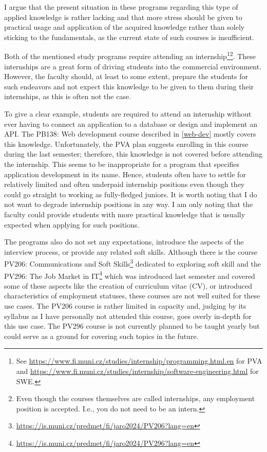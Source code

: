 \documentclass[
  digital,
  color,
  oneside,
  nosansbold,
  nocolorbold,
  nolof,
  nolot,
]{fithesis4}
\begin{document}
I argue that the present situation in these programs regarding this type of applied knowledge is rather lacking and that more stress should be given to practical usage and application of the acquired knowledge rather than solely sticking to the fundamentals, as the current state of such courses is insufficient.

Both of the mentioned study programs require attending an internship\footnote{See \url{https://www.fi.muni.cz/studies/internship/programming.html.en} for PVA and \url{https://www.fi.muni.cz/studies/internship/software-engineering.html} for SWE.}\footnote{Even though the courses themselves are called internships, any employment position is accepted. I.e., you do not need to be an intern.}. These internships are a great form of driving students into the commercial environment. However, the faculty should, at least to some extent, prepare the students for such endeavors and not expect this knowledge to be given to them during their internships, as this is often not the case. 

To give a clear example, students are required to attend an internship without ever having to connect an application to a database or design and implement an API. The PB138: Web development course described in \cref{web-dev} mostly covers this knowledge. Unfortunately, the PVA plan suggests enrolling in this course during the last semester; therefore, this knowledge is not covered before attending the internship. This seems to be inappropriate for a program that specifies application development in its name. Hence, students often have to settle for relatively limited and often underpaid internship positions even though they could go straight to working as fully-fledged juniors. It is worth noting that I do not want to degrade internship positions in any way. I am only noting that the faculty could provide students with more practical knowledge that is usually expected when applying for such positions.

The programs also do not set any expectations, introduce the aspects of the interview process, or provide any related soft skills. Although there is the course PV206: Communications and Soft Skills\footnote{\url{https://is.muni.cz/predmet/fi/jaro2024/PV206?lang=en}} dedicated to exploring soft skill and the PV296: The Job Market in IT\footnote{\url{https://is.muni.cz/predmet/fi/jaro2024/PV296?lang=en}} which was introduced last semester and covered some of these aspects like the creation of curriculum vitae (CV), or introduced characteristics of employment statuses, these courses are not well suited for these use cases. The PV206 course is rather limited in capacity and, judging by its syllabus as I have personally not attended this course, goes overly in-depth for this use case. The PV296 course is not currently planned to be taught yearly but could serve as a ground for covering such topics in the future.
\end{document}
